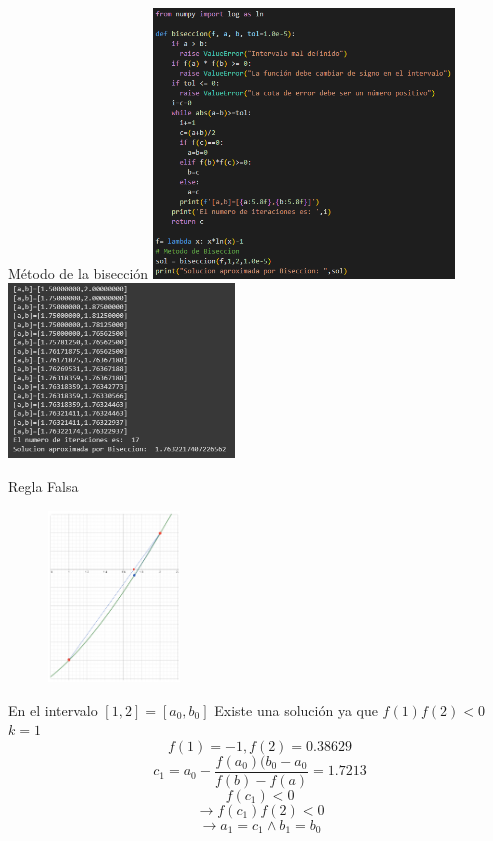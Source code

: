 \begin{frame}{Método de la bisección}
         \includegraphics[width=8cm]{p10-codigo-biseccion.png}
        \includegraphics[width=6cm]{p10-ejecucion-biseccion.png}
\end{frame}

\begin{frame}{Regla Falsa}
    \begin{figure}
        \centering
         \includegraphics[width=3.5cm]{p10-grafica-regla-falsa.png}
        \label{fig:enter-label}
    \end{figure}
   

    En el intervalo \( [1,2] = [a_0 , b_0] \)
    Existe una solución ya que \(f(1)f(2)<0 \) \\
    \(k=1\)
    \begin{equation*}
        f(1) = -1 , f(2) = 0.38629
    \end{equation*}
    \begin{equation*}
        c_1 = a_0 - \frac{f(a_0)(b_0 - a_0 }{f(b)-f(a)} = 1.7213
    \end{equation*}
    \begin{equation*}
        f(c_1)<0
    \end{equation*}
    \begin{equation*}
       \xrightarrow{} f(c_1)f(2)<0
    \end{equation*}
    \begin{equation*}
       \xrightarrow{} a_1 = c_1 \land b_1 = b_0
    \end{equation*}
\end{frame}

